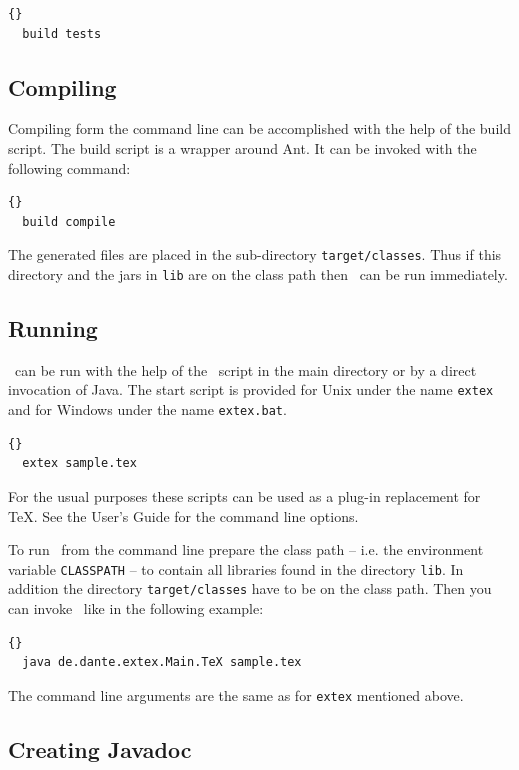 \documentclass{extex-doc}
\newcommand\File[1]{\texttt{#1}}
\begin{document}
\INCOMPLETE

\begin{lstlisting}{}
  build tests
\end{lstlisting}


\subsection{Compiling \ExTeX}

Compiling \ExTeX form the command line can be accomplished with the
help of the build script. The build script is a wrapper around Ant. It
can be invoked with the following command:

\begin{lstlisting}{}
  build compile
\end{lstlisting}

The generated files are placed in the sub-directory
\texttt{target/classes}. Thus if this directory and the jars in
\File{lib} are on the class path then \ExTeX\ can be run immediately.


\subsection{Running \ExTeX}

\ExTeX\ can be run with the help of the \ExTeX\ script in the main
directory or by a direct invocation of Java. The start script is
provided for Unix under the name \File{extex} and for Windows under
the name \File{extex.bat}.
\begin{lstlisting}{}
  extex sample.tex
\end{lstlisting}{}

For the usual purposes these scripts can be used as a plug-in
replacement for \TeX. See the User's Guide for the command line
options.

To run \ExTeX\ from the command line prepare the class path -- i.e.
the environment variable \texttt{CLASSPATH} -- to contain all
libraries found in the directory \texttt{lib}. In addition the
directory \texttt{target/classes} have to be on the class path.
Then you can invoke \ExTeX\ like in the following example:

\begin{lstlisting}{}
  java de.dante.extex.Main.TeX sample.tex
\end{lstlisting}{}

The command line arguments are the same as for \File{extex} mentioned
above.


\subsection{Creating Javadoc}
\end{document}

